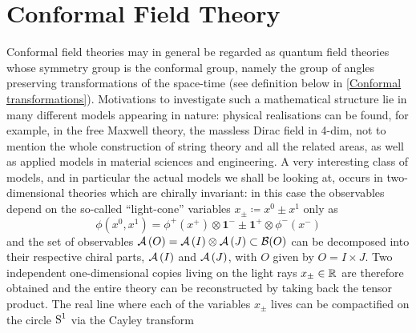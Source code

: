 \chapter{Conformal Field Theory}\label{ch:Conformal Field Theory}
\minitoc\mtcskip

\noindent Conformal field theories may in general be regarded as  
quantum field theories whose symmetry group is the conformal group,
namely the group of angles preserving transformations of the space-time
(see definition below in \ref{Conformal transformations}).
Motivations to investigate such a mathematical structure lie
in many different models appearing in nature: physical 
realisations can be found, for example, in the free
Maxwell theory, the massless Dirac field in 4-dim, not to 
mention the whole construction of string theory and all the 
related areas, as well as applied models in material sciences and
engineering. A very interesting class of models, and in
particular the actual models we shall be looking at, occurs 
in two-dimensional theories which are chirally invariant: 
in this case the observables depend on the so-called 
``light-cone'' variables $x_{\pm}\coloneqq x^0\pm x^1$ only as
\[
\phi(x^0,x^1)=\phi^+(x^+)\otimes \bm{1}^- \pm \bm{1}^+\otimes 
\phi^-(x^-)
\]
and the set of observables $\mathcal{A}\left(O\right)=\mathcal{A}\left(I\right)\otimes
\mathcal{A}\left(J\right)\subset\mathcal{B}(O)$ can be decomposed into
their respective chiral parts, $\mathcal{A}\left(I\right)$ and $\mathcal{A}\left(J\right)$,
with $O$ given by $O=I\times J$. 
Two independent one-dimensional copies 
living on the light rays $x_{\pm}\in\mathbb{R}$ are therefore obtained
and the entire theory can be reconstructed by taking back
the tensor product. The real line where each of the variables
$x_{\pm}$ lives can be compactified on the circle $\textrm{S}^1$ via the
Cayley transform 
